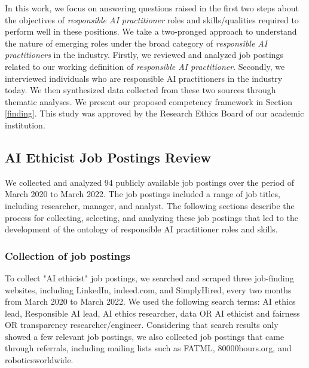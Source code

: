 \documentclass[sigconf]{acmart}
\begin{document}
In this work, we focus on answering questions raised in the first two steps about the objectives of \textit{responsible AI practitioner} roles and skills/qualities required to perform well in these positions. We take a two-pronged approach to understand the nature of emerging roles under the broad category of \textit{responsible AI practitioners} in the industry. Firstly, we reviewed and analyzed job postings related to our working definition of \textit{responsible AI practitioner}. Secondly, we interviewed individuals who are responsible AI practitioners in the industry today. We then synthesized data collected from these two sources through thematic analyses. We present our proposed competency framework in Section \ref{finding}. This study was approved by the Research Ethics Board of our academic institution.  


\subsection{AI Ethicist Job Postings Review}
We collected and analyzed 94 publicly available job postings over the period of March 2020 to March 2022. The job postings included a range of job titles, including researcher, manager, and analyst.  The following sections describe the process for collecting, selecting, and analyzing these job postings that led to the development of the ontology of responsible AI practitioner roles and skills. 
\subsubsection{Collection of job postings}
 To collect "\ac{AI} ethicist" job postings, we searched and scraped three job-finding websites, including LinkedIn, indeed.com, and SimplyHired, every two months from March 2020 to March 2022. We used the following search terms: \ac{AI} ethics lead, Responsible \ac{AI} lead, \ac{AI} ethics researcher, data OR \ac{AI} ethicist and fairness OR transparency researcher/engineer. Considering that search results only showed a few relevant job postings, we also collected job postings that came through referrals, including mailing lists such as FATML, 80000hours.org, and roboticsworldwide. 
 
\end{document}
